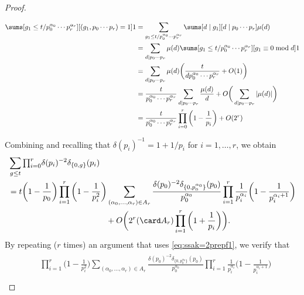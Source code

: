 \documentclass[12pt, reqno, twoside, letterpaper]{amsart}
\begin{document}
\begin{jetsam}
\begin{proof}
\begin{nixnix}
\begin{align*}
 \sums[g_1 \le t/p_0^{\alpha_0}\cdots p_r^{\alpha_r}][(g_1,p_0\cdots p_r) = 1] 1
  & =
   \sum_{g_1 \le t/p_0^{\alpha_0}\cdots p_r^{\alpha_r}}
    \sums[d \mid g_1][d \mid p_0\cdots p_r] \mu(d)
 \\
  & = 
   \sum_{d \mid p_0\cdots p_r}
    \mu(d)
     \sums[g_1 \le t/p_0^{\alpha_0}\cdots p_r^{\alpha_r}][g_1 \equiv 0 \bmod d] 1
 \\
 & = 
   \sum_{d \mid p_0\cdots p_r}
    \mu(d)
     \bigg(\frac{t}{dp_0^{\alpha_0}\cdots p_r^{\alpha_r}} + O(1)\bigg) 
 \\
  & = 
   \frac{t}{p_0^{\alpha_0}\cdots p_r^{\alpha_r}}
    \sum_{d \mid p_0\cdots p_r} \frac{\mu(d)}{d}
    +
     O\bigg(\sum_{d \mid p_0\cdots p_r} |\mu(d)|\bigg)
 \\
 & = 
  \frac{t}{p_0^{\alpha_0}\cdots p_r^{\alpha_r}}
   \prod_{i = 0}^r\bigg(1 - \frac{1}{p_i}\bigg)
    + 
     O(2^r) 
\end{align*}
\end{nixnix}
%
Combining and recalling that 
$\delta(p_i)^{-1} = 1 + 1/p_i$ for $i = 1,\ldots,r$, we obtain 
\begin{align}
 \begin{split}
  \label{eq:ssak=2prepf3} 
 & 
   \sum_{g \le t}
   {\textstyle \prod_{i = 0}^r } \delta(p_i)^{-2}\delta_{\{0,g\}}(p_i) 
 \\
 & = 
  t\bigg(1 - \frac{1}{p_0}\bigg)
   \prod_{i = 1}^r \bigg(1 - \frac{1}{p_i^2}\bigg) 
    \sum_{(\alpha_0,\ldots,\alpha_r) \in A_r}
     \frac{\delta(p_0)^{-2}\delta_{\{0,p_0^{\alpha_0}\}}(p_0)}{p_0^{\alpha_0}}
      \prod_{i = 1}^r\frac{1}{p_i^{\alpha_i}}\bigg(1 - \frac{1}{p_i^{\alpha_i + 1}}\bigg)
 \\
 & \hspace{120pt} + 
     O\bigg(
       2^r(\card A_r)\prod_{i = 1}^r\bigg(1 + \frac{1}{p_i}\bigg) 
      \bigg).
  \end{split}
\end{align}
%
By repeating ($r$ times) an argument that uses 
\eqref{eq:ssak=2prepf1}, we verify that 
\begin{align}
 \begin{split}
  \label{eq:ssak=2prepf4}
 & 
  \prod_{i = 1}^r\bigg(1 - \frac{1}{p_i^2}\bigg)
   \sum_{(\alpha_0,\ldots,\alpha_r) \in A_r}
    \frac{\delta(p_0)^{-2}\delta_{\{0,p_0^{\alpha_0}\}}(p_0)}{p_0^{\alpha_0}}
     \prod_{i = 1}^r 
      \frac{1}{p_i^{\alpha_i}}
       \bigg(1 - \frac{1}{p_i^{\alpha_i + 1}}\bigg) 
  \\

\end{split}
\end{align}
\end{proof}
\end{jetsam}
\end{document}
